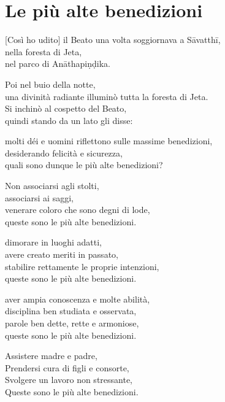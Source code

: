 \chapter{Le più alte benedizioni}


\begin{leader}
\end{leader}

[Così ho udito] il Beato una volta soggiornava a Sāvatthī,\\
 nella foresta di Jeta,\\ 
 nel parco di Anāthapiṇḍika.

Poi nel buio della notte,\\ 
 una divinità radiante illuminò tutta la foresta di Jeta.\\
Si inchinò al cospetto del Beato,\\
 quindi stando da un lato gli disse:

molti déi e uomini riflettono sulle massime benedizioni,\\
 desiderando felicità e sicurezza,\\
 quali sono dunque le più alte benedizioni?

Non associarsi agli stolti,\\
associarsi ai saggi,\\
venerare coloro che sono degni di lode,\\
queste sono le più alte benedizioni.

dimorare in luoghi adatti,\\
avere creato meriti in passato,\\
stabilire rettamente le proprie intenzioni,\\
queste sono le più alte benedizioni.

\clearpage

aver ampia conoscenza e molte abilità,\\
disciplina ben studiata e osservata,\\
parole ben dette, rette e armoniose,\\
queste sono le più alte benedizioni.

Assistere madre e padre,\\
Prendersi cura di figli e consorte,\\
Svolgere un lavoro non stressante,\\
Queste sono le più alte benedizioni.

